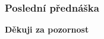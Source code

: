   \begin{frame}
    \frametitle{Poslední přednáška}
		
		\begin{center}
			\textbf{Děkuji za pozornost}
		\end{center}
		
	\end{frame}